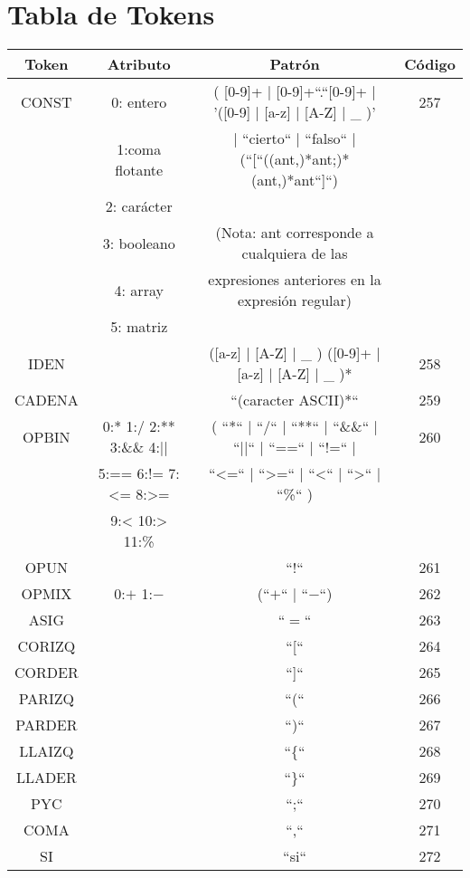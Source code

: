 \newpage
\section{Tabla de Tokens}

\begin{table}[H]
\centering
\begin{tabular}{| c | c | c | c |}
  \hline
  Token & Atributo & Patrón & Código \\ \hline
  CONST & 0: entero & ( [0-9]+ | [0-9]+``.``[0-9]+ | '([0-9] | [a-z] | [A-Z] | \_ )'  & 257 \\
  & 1:coma flotante & | ``cierto`` | ``falso`` | (``[``((ant,)*ant;)*(ant,)*ant``]``) &  \\
  & 2: carácter & & \\
  & 3: booleano & (Nota: ant corresponde a cualquiera de las & \\
  & 4: array & expresiones anteriores en la expresión regular)& \\
  & 5: matriz & & \\ \hline
  IDEN & & ([a-z] | [A-Z] | \_ ) ([0-9]+ | [a-z] | [A-Z] | \_ )* & 258 \\ \hline
  CADENA & & ``(caracter ASCII)*`` & 259 \\ \hline
  OPBIN & 0:*  1:/  2:**  3:\&\& 4:|| & ( ``*``  |  ``/``  |  ``**``  |  ``\&\&``  |  ``||`` |  ``==`` |  ``$!$=``  |   & 260 \\
  &   5:== 6:!= 7:\textless{}= 8:>=   & ``\textless{}=``  |  ``\textgreater=``  |  ``\textless`` |  ``\textgreater``  |  ``\%``  )& \\
  & 9:< 10:> 11:\% & & \\ \hline
OPUN & & ``$!$`` &  261 \\ \hline
OPMIX & 0:$+$ 1:$-$ & (``$+$`` | ``$-$``) & 262 \\ \hline
ASIG &  & ``$=$`` & 263 \\ \hline
CORIZQ & & ``[`` & 264 \\ \hline
CORDER & & ``]`` & 265\\ \hline
PARIZQ & & ``(`` & 266\\ \hline
PARDER & & ``)`` & 267\\ \hline
LLAIZQ & & ``\{`` & 268\\ \hline
LLADER & & ``\}`` & 269\\ \hline
PYC & & ``;`` & 270\\ \hline
COMA & & ``,`` & 271\\ \hline
SI & & ``si`` & 272\\ \hline

\end{tabular}
\end{table}
